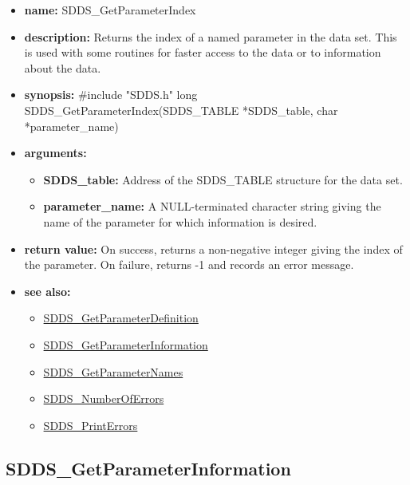 \documentclass[11pt]{article}
\newcommand{\progref}[1]{\hyperref{SDDS_#1}{{\tt SDDS\_#1} (}{)}{SDDS_#1}}
\begin{document}
\begin{itemize}
\item {\bf name:}\newline
SDDS\_GetParameterIndex
\item {\bf description:}\newline
Returns the index of a named parameter in the data set. This is used with some routines for faster access to the data or to information about the data.
\item {\bf synopsis:} \#include "SDDS.h"\newline
long SDDS\_GetParameterIndex(SDDS\_TABLE *SDDS\_table, char *parameter\_name)
\item {\bf arguments:}
\begin{itemize}
\item {\bf SDDS\_table:} Address of the SDDS\_TABLE structure for the data set.
\item {\bf parameter\_name:} A NULL-terminated character string giving the name of the parameter for which information is desired.
\end{itemize}
\item {\bf return value:}\newline
On success, returns a non-negative integer giving the index of the parameter. On failure, returns -1 and records an error message.
\item {\bf see also:}
\begin{itemize}
\item \progref{GetParameterDefinition}
\item \progref{GetParameterInformation}
\item \progref{GetParameterNames}
\item \progref{NumberOfErrors}
\item \progref{PrintErrors}
\end{itemize}
\end{itemize}

\subsection{SDDS\_GetParameterInformation}
\label{SDDS_GetParameterInformation}
\end{document}

